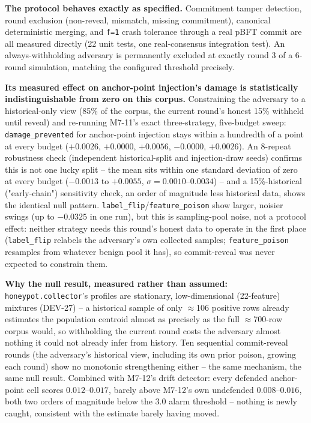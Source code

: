 \documentclass[conference]{IEEEtran}
\begin{document}
\textbf{The protocol behaves exactly as specified.} Commitment tamper detection, round exclusion
(non-reveal, mismatch, missing commitment), canonical deterministic merging, and \texttt{f=1}
crash tolerance through a real pBFT commit are all measured directly (22 unit tests, one
real-consensus integration test). An always-withholding adversary is permanently excluded at
exactly round 3 of a 6-round simulation, matching the configured threshold precisely.

\textbf{Its measured effect on anchor-point injection's damage is statistically indistinguishable
from zero on this corpus.} Constraining the adversary to a historical-only view (85\% of the
corpus, the current round's honest 15\% withheld until reveal) and re-running M7-11's exact
three-strategy, five-budget sweep: \texttt{damage\_prevented} for anchor-point injection stays
within a hundredth of a point at every budget ($+0.0026$, $+0.0000$, $+0.0056$, $-0.0000$,
$+0.0026$). An 8-repeat robustness check (independent historical-split and injection-draw seeds)
confirms this is not one lucky split -- the mean sits within one standard deviation of zero at
every budget ($-0.0013$ to $+0.0055$, $\sigma=0.0010$--$0.0034$) -- and a 15\%-historical
("early-chain") sensitivity check, an order of magnitude less historical data, shows the identical
null pattern. \texttt{label\_flip}/\texttt{feature\_poison} show larger, noisier swings (up to
$-0.0325$ in one run), but this is sampling-pool noise, not a protocol effect: neither strategy
needs this round's honest data to operate in the first place (\texttt{label\_flip} relabels the
adversary's own collected samples; \texttt{feature\_poison} resamples from whatever benign pool it
has), so commit-reveal was never expected to constrain them.

\textbf{Why the null result, measured rather than assumed:} \texttt{honeypot.collector}'s profiles
are stationary, low-dimensional (22-feature) mixtures (DEV-27) -- a historical sample of only
$\approx$106 positive rows already estimates the population centroid almost as precisely as the
full $\approx$700-row corpus would, so withholding the current round costs the adversary almost
nothing it could not already infer from history. Ten sequential commit-reveal rounds (the
adversary's historical view, including its own prior poison, growing each round) show no
monotonic strengthening either -- the same mechanism, the same null result. Combined with M7-12's
drift detector: every defended anchor-point cell scores $0.012$--$0.017$, barely above M7-12's own
undefended $0.008$--$0.016$, both two orders of magnitude below the $3.0$ alarm threshold --
nothing is newly caught, consistent with the estimate barely having moved.
\end{document}
